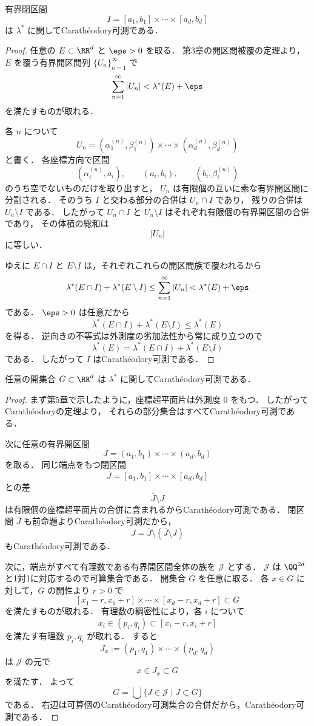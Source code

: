 \begin{proposition}[閉区間はCarathéodory可測]
有界閉区間
\[
I=[a_1,b_1]\times\cdots\times[a_d,b_d]
\]
は $\lambda^*$ に関してCarathéodory可測である．
\end{proposition}
\begin{proof}
任意の $E \subset \RR^d$ と $\eps>0$ を取る．
第3章の開区間被覆の定理より，
$E$ を覆う有界開区間列 $\{U_n\}_{n=1}^{\infty}$ で
\[
\sum_{n=1}^{\infty}|U_n|<\lambda^*(E)+\eps
\]
を満たすものが取れる．

各 $n$ について
\[
U_n=(\alpha_1^{(n)},\beta_1^{(n)})\times\cdots\times(\alpha_d^{(n)},\beta_d^{(n)})
\]
と書く．
各座標方向で区間
\[
(\alpha_i^{(n)},a_i),\qquad
(a_i,b_i),\qquad
(b_i,\beta_i^{(n)})
\]
のうち空でないものだけを取り出すと，
$U_n$ は有限個の互いに素な有界開区間に分割される．
そのうち $I$ と交わる部分の合併は $U_n\cap I$ であり，
残りの合併は $U_n\setminus I$ である．
したがって $U_n\cap I$ と $U_n\setminus I$ はそれぞれ有限個の有界開区間の合併であり，
その体積の総和は
\[
|U_n|
\]
に等しい．

ゆえに $E\cap I$ と $E\setminus I$ は，それぞれこれらの開区間族で覆われるから
\[
\lambda^*(E\cap I)+\lambda^*(E\setminus I)
\le
\sum_{n=1}^{\infty}|U_n|
<
\lambda^*(E)+\eps
\]
である．
$\eps>0$ は任意だから
\[
\lambda^*(E\cap I)+\lambda^*(E\setminus I)\le \lambda^*(E)
\]
を得る．
逆向きの不等式は外測度の劣加法性から常に成り立つので
\[
\lambda^*(E)
=
\lambda^*(E\cap I)+\lambda^*(E\setminus I)
\]
である．
したがって $I$ はCarathéodory可測である．
\end{proof}

\begin{proposition}[開集合の可測性]
任意の開集合 $G \subset \RR^d$ は $\lambda^*$ に関してCarathéodory可測である．
\end{proposition}
\begin{proof}
まず第5章で示したように，座標超平面片は外測度 $0$ をもつ．
したがってCarathéodoryの定理より，
それらの部分集合はすべてCarathéodory可測である．

次に任意の有界開区間
\[
J=(a_1,b_1)\times\cdots\times(a_d,b_d)
\]
を取る．
同じ端点をもつ閉区間
\[
\overline J=[a_1,b_1]\times\cdots\times[a_d,b_d]
\]
との差
\[
\overline J\setminus J
\]
は有限個の座標超平面片の合併に含まれるからCarathéodory可測である．
閉区間 $\overline J$ も前命題よりCarathéodory可測だから，
\[
J=\overline J\setminus(\overline J\setminus J)
\]
もCarathéodory可測である．

次に，端点がすべて有理数である有界開区間全体の族を $\mathcal J$ とする．
$\mathcal J$ は $\QQ^{2d}$ と1対1に対応するので可算集合である．
開集合 $G$ を任意に取る．
各 $x \in G$ に対して，$G$ の開性より $r>0$ で
\[
[x_1-r,x_1+r]\times\cdots\times[x_d-r,x_d+r]\subset G
\]
を満たすものが取れる．
有理数の稠密性により，各 $i$ について
\[
x_i \in (p_i,q_i)\subset [x_i-r,x_i+r]
\]
を満たす有理数 $p_i,q_i$ が取れる．
すると
\[
J_x:=(p_1,q_1)\times\cdots\times(p_d,q_d)
\]
は $\mathcal J$ の元で
\[
x\in J_x\subset G
\]
を満たす．
よって
\[
G=\bigcup\{J \in \mathcal J\mid J\subset G\}
\]
である．
右辺は可算個のCarathéodory可測集合の合併だから，Carathéodory可測である．
\end{proof}


